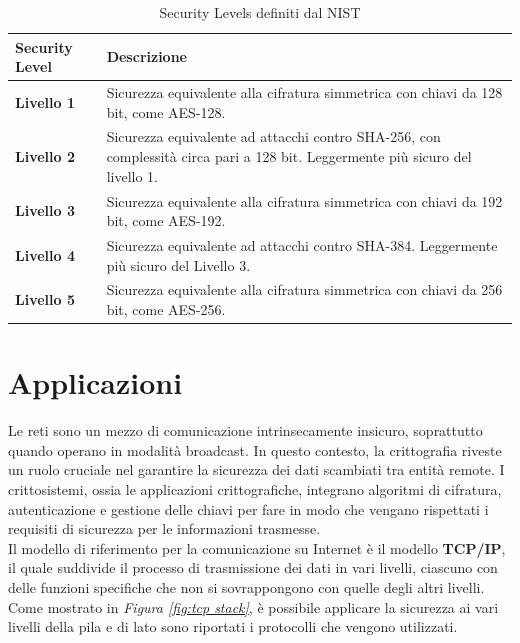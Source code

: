 \begin{table}[ht]
    \centering
    \begin{tabular}{>{\centering\arraybackslash}m{3cm}p{10cm}}
        \toprule
        \textbf{Security Level} & \textbf{Descrizione} \\
        \midrule
        \textbf{Livello 1} & Sicurezza equivalente alla cifratura simmetrica con chiavi da 128 bit, come AES-128.\\
        \textbf{Livello 2} & Sicurezza equivalente ad attacchi contro SHA-256, con complessità circa pari a 128 bit. Leggermente più sicuro del livello 1. \\
        \textbf{Livello 3} & Sicurezza equivalente alla cifratura simmetrica con chiavi da 192 bit, come AES-192. \\
        \textbf{Livello 4} & Sicurezza equivalente ad attacchi contro SHA-384. Leggermente più sicuro del Livello 3. \\
        \textbf{Livello 5} & Sicurezza equivalente alla cifratura simmetrica con chiavi da 256 bit, come AES-256. \\
        \hline
    \end{tabular}
    \caption{Security Levels definiti dal NIST}
    \label{tab:security-levels}
\end{table}

\newpage
\section{Applicazioni}

Le reti sono un  mezzo di comunicazione intrinsecamente insicuro, soprattutto quando operano in modalità broadcast. In
questo contesto, la crittografia riveste un ruolo cruciale nel garantire la
sicurezza dei dati scambiati tra entità remote. I crittosistemi, ossia le
applicazioni crittografiche, integrano algoritmi di cifratura, autenticazione e
gestione delle chiavi per fare in modo che vengano rispettati i requisiti di sicurezza 
per le informazioni trasmesse.\\ 

\noindent
Il modello di riferimento per la comunicazione su Internet è il modello \textbf{TCP/IP}, il quale  suddivide il processo di trasmissione dei dati
in vari livelli, ciascuno con delle funzioni specifiche che non si sovrappongono con quelle degli altri livelli. Come mostrato in \textit{Figura \ref{fig:tcp stack}},
è possibile applicare la sicurezza ai vari livelli della pila e di lato sono riportati i protocolli che vengono utilizzati. 

